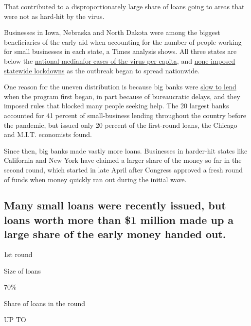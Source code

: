 That contributed to a disproportionately large share of loans going to
areas that were not as hard-hit by the virus.

Businesses in Iowa, Nebraska and North Dakota were among the biggest
beneficiaries of the early aid when accounting for the number of people
working for small businesses in each state, a Times analysis shows. All
three states are below the
\href{https://www.nytimes3xbfgragh.onion/interactive/2020/us/coronavirus-us-cases.html}{national
median}\href{https://www.nytimes3xbfgragh.onion/interactive/2020/us/coronavirus-us-cases.html}{for
cases of the virus per capita}, and
\href{https://www.nytimes3xbfgragh.onion/interactive/2020/us/states-reopen-map-coronavirus.html}{none
imposed statewide lockdowns} as the outbreak began to spread nationwide.

One reason for the uneven distribution is because big banks were
\href{https://www.nytimes3xbfgragh.onion/2020/04/02/business/small-business-coronavirus-stimulus.html}{slow
to lend} when the program first began, in part because of bureaucratic
delays, and they imposed rules that blocked many people seeking help.
The 20 largest banks accounted for 41 percent of small-business lending
throughout the country before the pandemic, but issued only 20 percent
of the first-round loans, the Chicago and M.I.T. economists found.

Since then, big banks made vastly more loans. Businesses in harder-hit
states like California and New York have claimed a larger share of the
money so far in the second round, which started in late April after
Congress approved a fresh round of funds when money quickly ran out
during the initial wave.

\hypertarget{many-small-loans-were-recently-issued-but-loans-worth-more-than-1-million-made-up-a-large-share-of-the-early-money-handed-out}{%
\subsection{Many small loans were recently issued, but loans worth more
than \$1 million made up a large share of the early money handed
out.}\label{many-small-loans-were-recently-issued-but-loans-worth-more-than-1-million-made-up-a-large-share-of-the-early-money-handed-out}}

1st round

Size of loans

70\%

Share of loans in the round

UP TO

